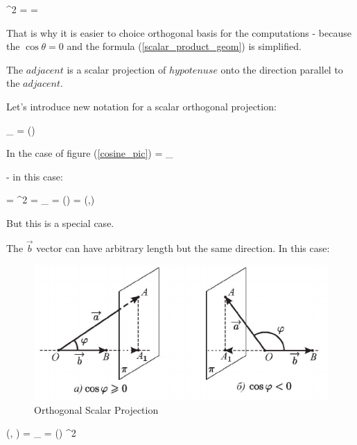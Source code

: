 \documentclass{article}
\begin{document}
\beq \label{scalar_product_geom}
\vert {} \vert^{2} =  = 
\eeq

That is why it is easier to choice orthogonal basis for the computations - because the $\cos \theta = 0$ and the formula (\ref{scalar_product_geom}) is simplified.



The $adjacent$ is a scalar projection of $hypotenuse$ onto the direction parallel to the $adjacent$.

Let's introduce new notation for a scalar orthogonal projection:

\beq \label{scalar_projection}
_{} = \vert {} \vert \cos()
\eeq 

In the case of figure (\ref{cosine_pic})
\beq
\vert {} \vert = _{}
\eeq

- in this case:

\beq
\vert {} \vert \vert {} \vert = {\vert {} \vert}^2 = 
\vert {} \vert \cdot {}_{} = \vert {} \vert \vert {} \vert \cos() = 
(,)
\eeq

But this is a special case.

The $\vec{b}$ vector can have arbitrary length but the same direction. In this case:

\begin{figure}[!htbp]
\centering
\includegraphics[scale=0.5]{orth_proj_4}
\caption{Orthogonal Scalar Projection}\label{orth_proj_4}
\end{figure}


\beq \label{geom_dot_product_1}
(, ) = 
\vert {} \vert \cdot {}_{} = \vert {} \vert \vert {} \vert \cos()
\neq
{\vert {} \vert}^2
\eeq
\end{document}
